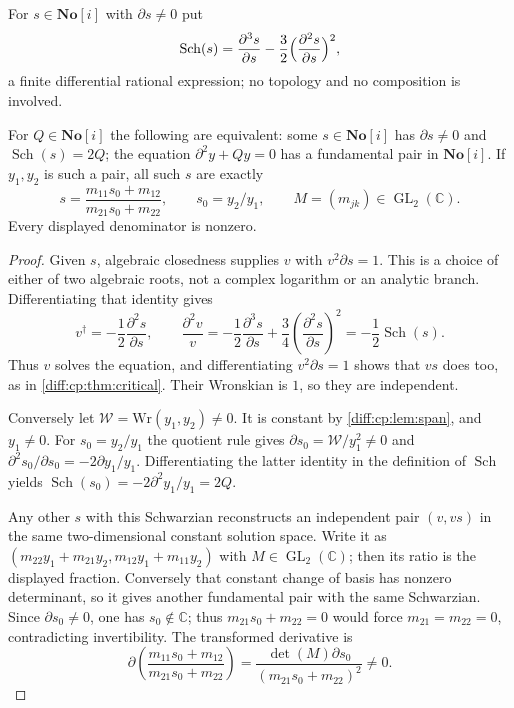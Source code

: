 \documentclass[11pt,letterpaper]{article}
\numberwithin{equation}{section}
\theoremstyle{definition}
\theoremstyle{remark}
\newcommand{\SC}{\mathbf{No}[i]}
\newcommand{\C}{\mathbb C}
\newcommand{\der}{\partial}
\newcommand{\GL}{\operatorname{GL}}
\newcommand{\Sch}{\operatorname{Sch}}
\begin{document}
For $s\in\SC$ with $\der s\neq0$ put
\begin{equation}\label{diff:cp:eq:schwarzian}
 \Sch(s)=\frac{\der^{3}s}{\der s}-\frac32\Bigl(\frac{\der^{2}s}{\der s}\Bigr)^{2},
\end{equation}
a finite differential rational expression; no topology and no composition is
involved.

\begin{lemma}
\label{diff:cp:lem:schwarzian}
For $Q\in\SC$ the following are equivalent: some $s\in\SC$ has $\der s\neq0$ and
$\Sch(s)=2Q$; the equation $\der^{2}y+Qy=0$ has a fundamental pair in $\SC$. If
$y_{1},y_{2}$ is such a pair, all such $s$ are exactly
\[
 s=\frac{m_{11}s_0+m_{12}}{m_{21}s_0+m_{22}},\qquad
 s_0=y_2/y_1,\qquad M=(m_{jk})\in\GL_2(\C).
\]
Every displayed denominator is nonzero.
\end{lemma}
\begin{proof}
Given $s$, algebraic closedness supplies $v$ with
$v^2\der s=1$. This is a choice of either of two algebraic roots,
not a complex logarithm or an analytic branch. Differentiating
that identity gives
\[
 v^\dagger=-\frac12\frac{\der^2s}{\der s},\qquad
 \frac{\der^2v}{v}
 =-\frac12\frac{\der^3s}{\der s}
   +\frac34\left(\frac{\der^2s}{\der s}\right)^2
 =-\frac12\Sch(s).
\]
Thus $v$ solves the equation, and differentiating $v^2\der s=1$
shows that $vs$ does too, as in \cref{diff:cp:thm:critical}.
Their Wronskian is $1$, so they are independent.

Conversely let $\mathcal W=\mathrm{Wr}(y_1,y_2)\neq0$.
It is constant by \cref{diff:cp:lem:span}, and $y_1\neq0$.
For $s_0=y_2/y_1$ the quotient rule gives
$\der s_0=\mathcal W/y_1^2\neq0$ and
$\der^2s_0/\der s_0=-2\der y_1/y_1$. Differentiating the latter
identity in the definition of $\Sch$ yields
$\Sch(s_0)=-2\der^2y_1/y_1=2Q$.

Any other $s$ with this Schwarzian reconstructs an independent
pair $(v,vs)$ in the same two-dimensional constant solution space.
Write it as
$(m_{22}y_1+m_{21}y_2,m_{12}y_1+m_{11}y_2)$ with
$M\in\GL_2(\C)$; then its ratio is the displayed fraction.
Conversely that
constant change of basis has nonzero determinant, so it gives
another fundamental pair with the same Schwarzian. Since
$\der s_0\neq0$, one has $s_0\notin\C$; thus
$m_{21}s_0+m_{22}=0$ would force $m_{21}=m_{22}=0$,
contradicting invertibility. The transformed derivative is
\[
 \der\left(\frac{m_{11}s_0+m_{12}}{m_{21}s_0+m_{22}}\right)
 =\frac{\det(M)\der s_0}{(m_{21}s_0+m_{22})^2}\neq0.
\]
\end{proof}
\end{document}
